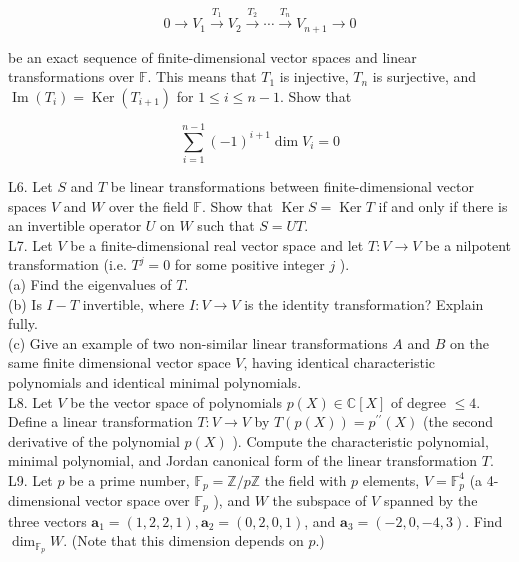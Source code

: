 $$
0 \longrightarrow V_{1} \xrightarrow{T_{1}} V_{2} \xrightarrow{T_{2}} \cdots \xrightarrow{T_{n}} V_{n+1} \longrightarrow 0
$$

be an exact sequence of finite-dimensional vector spaces and linear transformations over $\mathbb{F}$. This means that $T_{1}$ is injective, $T_{n}$ is surjective, and $\operatorname{Im}\left(T_{i}\right)=\operatorname{Ker}\left(T_{i+1}\right)$ for $1 \leq i \leq n-1$. Show that

$$
\sum_{i=1}^{n-1}(-1)^{i+1} \operatorname{dim} V_{i}=0
$$

L6. Let $S$ and $T$ be linear transformations between finite-dimensional vector spaces $V$ and $W$ over the field $\mathbb{F}$. Show that $\operatorname{Ker} S=\operatorname{Ker} T$ if and only if there is an invertible operator $U$ on $W$ such that $S=U T$.\\
L7. Let $V$ be a finite-dimensional real vector space and let $T: V \rightarrow V$ be a nilpotent transformation (i.e. $T^{j}=0$ for some positive integer $j$ ).\\
(a) Find the eigenvalues of $T$.\\
(b) Is $I-T$ invertible, where $I: V \rightarrow V$ is the identity transformation? Explain fully.\\
(c) Give an example of two non-similar linear transformations $A$ and $B$ on the same finite dimensional vector space $V$, having identical characteristic polynomials and identical minimal polynomials.\\
L8. Let $V$ be the vector space of polynomials $p(X) \in \mathbb{C}[X]$ of degree $\leq 4$. Define a linear transformation $T: V \rightarrow V$ by $T(p(X))=p^{\prime \prime}(X)$ (the second derivative of the polynomial $p(X)$ ). Compute the characteristic polynomial, minimal polynomial, and Jordan canonical form of the linear transformation $T$.\\
L9. Let $p$ be a prime number, $\mathbb{F}_{p}=\mathbb{Z} / p \mathbb{Z}$ the field with $p$ elements, $V=\mathbb{F}_{p}^{4}$ (a 4-dimensional vector space over $\mathbb{F}_{p}$ ), and $W$ the subspace of $V$ spanned by the three vectors $\mathbf{a}_{1}=(1,2,2,1), \mathbf{a}_{2}=(0,2,0,1)$, and $\mathbf{a}_{3}=(-2,0,-4,3)$. Find $\operatorname{dim}_{\mathbb{F}_{p}} W$. (Note that this dimension depends on $p$.)
